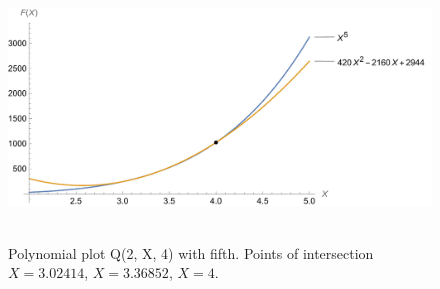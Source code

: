 ﻿\begin{figure}[H]
    \centering
    \includegraphics[width=1\textwidth]{sections/images/04_plots_polynomial_q2_n4_with_fifth}
    ~\caption{Polynomial plot Q(2, X, 4) with fifth.
    Points of intersection $X=3.02414$, $X=3.36852$, $X=4$.}\label{fig:figure10}
\end{figure}
